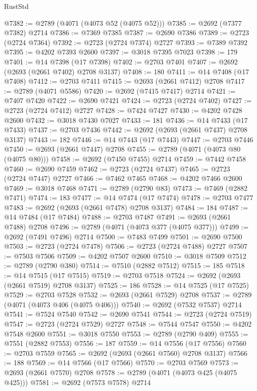 \begin{lexlean}{RustStd}
\begin{coremodule}
{\begin{coremodule}
{{{{{{{{{{{{{{{{{{{{{{{{{{{{{{{{{{{{{{{@7382 := @2789 (@4071 (@4073 @52 (@4075 @52)))
@7385 := @2692 (@7377 @7382) @2714
@7386 := @7369 @7385
@7387 := @2690 @7386
@7389 := @2723 (@2724 @7364)
@7392 := @2723 (@2724 @7374) @2727
@7393 := @7389 @7392
@7395 := @4202 @7393 @2600
@7397 := @3018 @7395 @7023
@7398 := 179
@7401 := @14 @7398 (@17 @7398)
@7402 := @2703 @7401
@7407 := @2692 (@2693 (@2661 @7402) @2708 @3137)
@7408 := 180
@7411 := @14 @7408 (@17 @7408)
@7412 := @2703 @7411
@7415 := @2693 (@2661 @7412) @2708
@7417 := @2789 (@4071 @5586)
@7420 := @2692 (@7415 @7417) @2714
@7421 := @7407 @7420
@7422 := @2690 @7421
@7424 := @2723 (@2724 @7402)
@7427 := @2723 (@2724 @7412) @2727
@7428 := @7424 @7427
@7430 := @4202 @7428 @2600
@7432 := @3018 @7430 @7027
@7433 := 181
@7436 := @14 @7433 (@17 @7433)
@7437 := @2703 @7436
@7442 := @2692 (@2693 (@2661 @7437) @2708 @3137)
@7443 := 182
@7446 := @14 @7443 (@17 @7443)
@7447 := @2703 @7446
@7450 := @2693 (@2661 @7447) @2708
@7455 := @2789 (@4071 (@4073 @80 (@4075 @80)))
@7458 := @2692 (@7450 @7455) @2714
@7459 := @7442 @7458
@7460 := @2690 @7459
@7462 := @2723 (@2724 @7437)
@7465 := @2723 (@2724 @7447) @2727
@7466 := @7462 @7465
@7468 := @4202 @7466 @2600
@7469 := @3018 @7468
@7471 := @2789 (@2790 @83)
@7473 := @7469 (@2882 @7471)
@7474 := 183
@7477 := @14 @7474 (@17 @7474)
@7478 := @2703 @7477
@7483 := @2692 (@2693 (@2661 @7478) @2708 @3137)
@7484 := 184
@7487 := @14 @7484 (@17 @7484)
@7488 := @2703 @7487
@7491 := @2693 (@2661 @7488) @2708
@7496 := @2789 (@4071 (@4073 @377 (@4075 @377)))
@7499 := @2692 (@7491 @7496) @2714
@7500 := @7483 @7499
@7501 := @2690 @7500
@7503 := @2723 (@2724 @7478)
@7506 := @2723 (@2724 @7488) @2727
@7507 := @7503 @7506
@7509 := @4202 @7507 @2600
@7510 := @3018 @7509
@7512 := @2789 (@2790 @380)
@7514 := @7510 (@2882 @7512)
@7515 := 185
@7518 := @14 @7515 (@17 @7515)
@7519 := @2703 @7518
@7524 := @2692 (@2693 (@2661 @7519) @2708 @3137)
@7525 := 186
@7528 := @14 @7525 (@17 @7525)
@7529 := @2703 @7528
@7532 := @2693 (@2661 @7529) @2708
@7537 := @2789 (@4071 (@4073 @406 (@4075 @406)))
@7540 := @2692 (@7532 @7537) @2714
@7541 := @7524 @7540
@7542 := @2690 @7541
@7544 := @2723 (@2724 @7519)
@7547 := @2723 (@2724 @7529) @2727
@7548 := @7544 @7547
@7550 := @4202 @7548 @2600
@7551 := @3018 @7550
@7553 := @2789 (@2790 @409)
@7555 := @7551 (@2882 @7553)
@7556 := 187
@7559 := @14 @7556 (@17 @7556)
@7560 := @2703 @7559
@7565 := @2692 (@2693 (@2661 @7560) @2708 @3137)
@7566 := 188
@7569 := @14 @7566 (@17 @7566)
@7570 := @2703 @7569
@7573 := @2693 (@2661 @7570) @2708
@7578 := @2789 (@4071 (@4073 @425 (@4075 @425)))
@7581 := @2692 (@7573 @7578) @2714
}}}}}}}}}}}}}}}}}}}}}}}}}}}}}}}}}}}}}}}
\end{coremodule}}
\end{coremodule}
\end{lexlean}

